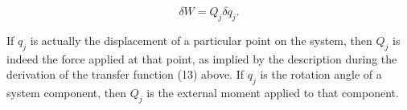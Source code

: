   \begin{equation*}\delta W=Q_j \delta q_j. \tag{14}\end{equation*} 

  If $q_j$ is actually the displacement of a particular point on the system, 
  then $Q_j$ is indeed the force applied at that point, as implied by the 
  description during the derivation of the transfer function (13) above. If 
  $q_j$ is the rotation angle of a system component, then $Q_j$ is the external 
  moment applied to that component. 